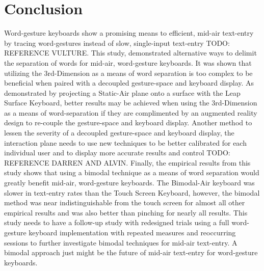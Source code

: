 \section {Conclusion}
Word-gesture keyboards show a promising means to efficient, mid-air text-entry by tracing word-gestures instead of slow, single-input text-entry TODO: REFERENCE VULTURE. This study, demonstrated alternative ways to delimit the separation of words for mid-air, word-gesture keyboards. It was shown that utilizing the 3rd-Dimension as a means of word separation is too complex to be beneficial when paired with a decoupled gesture-space and keyboard display. As demonstrated by projecting a Static-Air plane onto a surface with the Leap Surface Keyboard, better results may be achieved when using the 3rd-Dimension as a means of word-separation if they are complimented by an augmented reality design to re-couple the gesture-space and keyboard display. Another method to lessen the severity of a decoupled gesture-space and keyboard display, the interaction plane needs to use new techniques to be better calibrated for each individual user and to display more accurate results and control TODO: REFERENCE DARREN AND ALVIN. Finally, the empirical results from this study shows that using a bimodal technique as a means of word separation would greatly benefit mid-air, word-gesture keyboards. The Bimodal-Air keyboard was slower in text-entry rates than the Touch Screen Keyboard, however, the bimodal method was near indistinguishable from the touch screen for almost all other empirical results and was also better than pinching for nearly all results. This study needs to have a follow-up study with redesigned trials using a full word-gesture keyboard implementation with repeated measures and reoccurring sessions to further investigate bimodal techniques for mid-air text-entry. A bimodal approach just might be the future of mid-air text-entry for word-gesture keyboards.